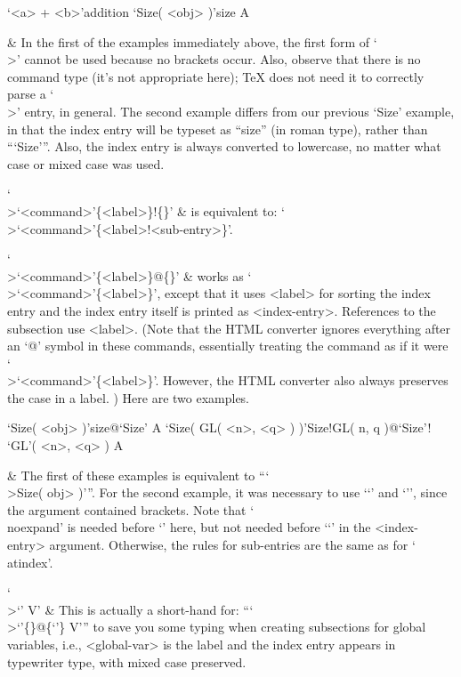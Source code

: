 \begintt
\>`<a> + <b>'{addition}
\>`Size( <obj> )'{size} A
\endtt

  & In the first of the examples immediately above,  the  first  form  of
    `\\>' cannot be used because no brackets occur.  Also,  observe  that
    there is no command type (it's not appropriate here); {\TeX} does not
    need it to correctly parse a `\\>'  entry,  in  general.  The  second
    example differs from our previous `Size' example, in that  the  index
    entry will be typeset  as  ``size''  (in  roman  type),  rather  than
    ``{`Size'}''. Also, the index entry is always converted to lowercase,
    no matter what case or mixed case was used.

`\\>\lq<command>\rq\{<label>\}!\{<sub-entry>\}' &
    is equivalent to: `\\>\lq<command>\rq\{<label>!<sub-entry>\}'.

`\\>\lq<command>\rq\{<label>\}@\{<index-entry>\}' &
    works as `\\>\lq<command>\rq\{<label>\}', except that it uses <label>
    for sorting the index entry and the index entry itself is printed  as
    <index-entry>. References to the subsection use <label>.  (Note  that
    the HTML converter ignores everything after an `@'  symbol  in  these
    commands,  essentially  treating  the   command   as   if   it   were
    `\\>\lq<command>\rq\{<label>\}'. However,  the  HTML  converter  also
    always preserves the case in a label. ) Here are two examples.

\begintt
\>`Size( <obj> )'{size}@{`Size'} A
\>`Size( GL( <n>, <q> ) )'{Size!GL( n, q )}@{`Size'! `GL'( \noexpand<n>, \noexpand<q> )} A
\endtt

  & The first of these examples is equivalent to ``{`\\>Size( \<obj> )'}''.
    For the second example, it was necessary  to  use  `\lq'  and  `\rq',
    since the argument contained  brackets.  Note  that  `\\noexpand'  is
    needed  before  `\<'  here,  but  not  needed  before  `\lq'  in  the
    <index-entry> argument. Otherwise, the rules for sub-entries are  the
    same as for `\\atindex'.

`\\>\lq<global-var>{\rq} V' &
    This is actually a short-hand for: 
    ``{`\\>\lq<global-var>\rq\{<global-var>\}@\{\lq<global-var>\rq\} V'}''
    to  save  you  some  typing  when  creating  subsections  for  global
    variables, i.e., <global-var>  is  the  label  and  the  index  entry
    appears in typewriter type, with mixed case preserved.

